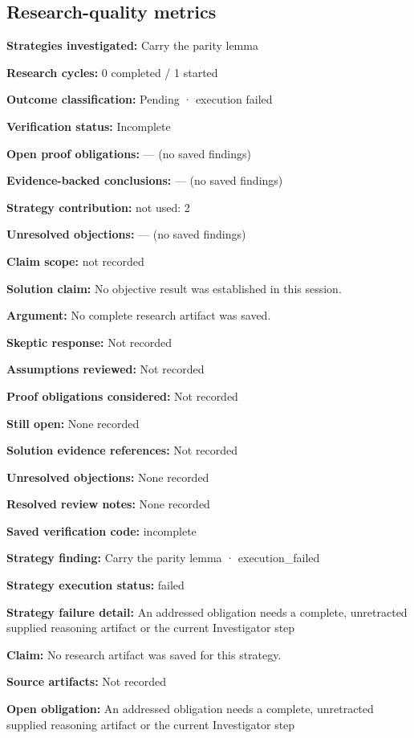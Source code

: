 \documentclass[11pt]{article}
\begin{document}
\subsection{Research-quality metrics}
\textbf{Strategies investigated:} Carry the parity lemma\par
\textbf{Research cycles:} 0 completed / 1 started\par
\textbf{Outcome classification:} Pending · execution failed\par
\textbf{Verification status:} Incomplete\par
\textbf{Open proof obligations:} — (no saved findings)\par
\textbf{Evidence-backed conclusions:} — (no saved findings)\par
\textbf{Strategy contribution:} not used: 2\par
\textbf{Unresolved objections:} — (no saved findings)\par
\textbf{Claim scope:} not recorded\par
\textbf{Solution claim:} No objective result was established in this session.\par
\textbf{Argument:} No complete research artifact was saved.\par
\textbf{Skeptic response:} Not recorded\par
\textbf{Assumptions reviewed:} Not recorded\par
\textbf{Proof obligations considered:} Not recorded\par
\textbf{Still open:} None recorded\par
\textbf{Solution evidence references:} Not recorded\par
\textbf{Unresolved objections:} None recorded\par
\textbf{Resolved review notes:} None recorded\par
\textbf{Saved verification code:} incomplete\par
\textbf{Strategy finding:} Carry the parity lemma · execution\_failed\par
\textbf{Strategy execution status:} failed\par
\textbf{Strategy failure detail:} An addressed obligation needs a complete, unretracted supplied reasoning artifact or the current Investigator step\par
\textbf{Claim:} No research artifact was saved for this strategy.\par
\textbf{Source artifacts:} Not recorded\par
\textbf{Open obligation:} An addressed obligation needs a complete, unretracted supplied reasoning artifact or the current Investigator step\par
\end{document}
